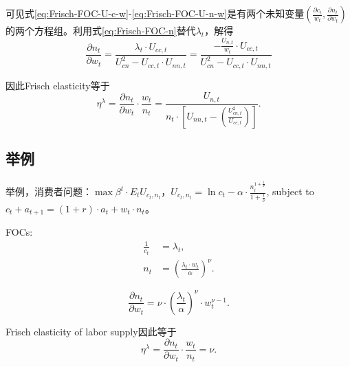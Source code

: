 \begin{subappendices}
可见式\eqref{eq:Frisch-FOC-U-c-w}-\eqref{eq:Frisch-FOC-U-n-w}是有两个未知变量$\left(\frac{\partial c_t}{w_t},\frac{\partial n_t}{\partial w_t}\right)$的两个方程组。利用式\eqref{eq:Frisch-FOC-n}替代$\lambda_t$，解得
\begin{equation}
  \label{eq:Frisch-ela}
  \frac{\partial n_t}{\partial w_t} = \frac{\lambda_t \cdot U_{cc,t}}{U_{cn}^2 - U_{cc,t} \cdot U_{nn,t}} = \frac{- \frac{U_{n,t}}{w_t} \cdot U_{cc,t}}{U_{cn}^2 - U_{cc,t} \cdot U_{nn,t}}
\end{equation}

因此Frisch elasticity等于
\begin{equation}
  \label{eq:Frisch-ela-consumption-example}
  \eta^{\lambda} = \frac{\partial n_t}{\partial w_t} \cdot \frac{w_t}{n_t} = \frac{U_{n,t}}{n_t \cdot \left[U_{nn,t}-\left(\frac{U_{cn,t}^2}{U_{cc,t}}\right)\right]}.
\end{equation}

\subsection{举例}
举例，消费者问题：$\max \beta^t \cdot E_t U_{c_t,n_t}$，$U_{c_t,n_t} = \ln c_t - \alpha \cdot \frac{n_t^{1+\frac{1}{\nu}}}{1+\frac{1}{\nu}}$, subject to $c_t + a_{t+1} = (1+r) \cdot a_t + w_t \cdot n_t$。

FOCs:
\begin{align}
\label{Frisch-example-FOC-c}
\frac{1}{c_t} &= \lambda_t,\\
\label{Frisch-example-FOC-n}
n_t &= \left(\frac{\lambda_t \cdot w_t}{\alpha}\right)^{\nu}.
\end{align}

\begin{equation}
  \label{eq:Frisch-example-partial-n-w}
  \frac{\partial n_t}{\partial w_t} = \nu \cdot \left(\frac{\lambda_t}{\alpha}\right)^{\nu} \cdot w_t^{\nu -1}.
\end{equation}

Frisch elasticity of labor supply因此等于
\begin{equation}
  \label{eq:Frisch-example-ela}
  \eta^{\lambda} = \frac{\partial n_t}{\partial w_t} \cdot \frac{w_t}{n_t} = \nu.
\end{equation}


\end{subappendices}
